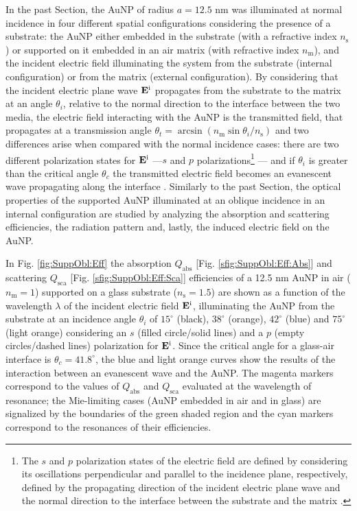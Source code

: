 
In the past Section, the AuNP of radius $a = 12.5$ nm was illuminated at normal incidence in four different spatial configurations considering the  presence of a substrate: the AuNP either embedded in the substrate (with a refractive index $n_\text{s}$) or supported on it embedded in an air matrix (with refractive index $n_\text{m}$), and the incident electric field  illuminating the system from the substrate (internal configuration) or from the matrix (external configuration). By considering that the incident electric plane wave $\vb{E}^\text{i}$  propagates from the substrate to the matrix at an angle $\theta_i$, relative to the normal direction to the interface between the two media, the electric field interacting with the AuNP is the transmitted field, that propagates at a transmission angle $\theta_t = \arcsin(n_\text{m}\sin\theta_i/n_\text{s})$ \cite{born_max_principle_1999} and two differences arise when compared with the normal incidence cases: there are two different polarization states for $\vb{E}^\text{i}$ ---$s$ and $p$ polarizations\footnote{%
    The $s$ and $p$ polarization states of the electric field are defined by considering its oscillations perpendicular and parallel to the incidence plane, respectively, defined by the propagating direction of the incident electric plane wave and the normal direction to the interface between the substrate and the matrix \cite{bohren_absorption_1983}.}%
--- and if $\theta_i$ is greater than the critical angle $\theta_c$ the transmitted electric field becomes an evanescent wave propagating along the interface  \cite{born_max_principle_1999}. Similarly to the past Section, the optical properties of the supported AuNP illuminated at an oblique incidence in an internal configuration are studied by analyzing the absorption and scattering efficiencies, the radiation pattern and, lastly, the induced electric field on the AuNP.

In Fig. \ref{fig:SuppObl:Eff} the absorption $Q_\text{abs}$ [Fig.  \ref{sfig:SuppObl:Eff:Abs}] and scattering $Q_\text{sca}$ [Fig. \ref{sfig:SuppObl:Eff:Sca}] efficiencies of a 12.5 nm AuNP in air ($n_\text{m} = 1$) supported on a glass substrate ($n_\text{s} = 1.5$) are shown as a function of the wavelength $\lambda$ of the incident electric field $\vb{E}^\text{i}$, illuminating the AuNP from the substrate at an incidence angle $\theta_i$ of $15^\circ$ (black),  $38^\circ$ (orange),   $42^\circ$ (blue) and  $75^\circ$ (light orange) considering an $s$ (filled circle/solid lines) and a $p$ (empty circles/dashed lines) polarization for $\vb{E}^\text{i}$. Since the critical angle for a glass-air interface is $\theta_c = 41.8^\circ$, the blue and light orange curves show the results of the interaction between an evanescent wave and the AuNP. The magenta markers correspond to the values of $Q_\text{abs}$ and $Q_\text{sca}$ evaluated at the wavelength of resonance; the Mie-limiting cases (AuNP embedded in air and in glass)  are signalized by the boundaries of the green shaded region  and the cyan markers correspond to the resonances of their efficiencies.

